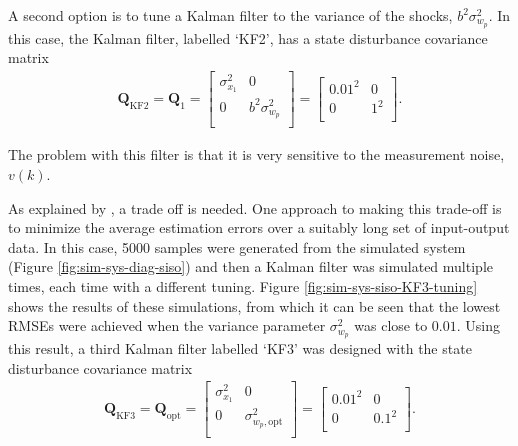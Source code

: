 A second option is to tune a Kalman filter to the variance of the shocks, $b^2\sigma_{w_p}^2$.  In this case, the Kalman filter, labelled `KF2', has a state disturbance covariance matrix
\begin{equation} \label{eq:sim-sys-siso-KF2-Q}
	\begin{aligned}
		\mathbf{Q}_{\text{KF2}}=\mathbf{Q}_1=\begin{bmatrix}
			\sigma_{x_1}^2 & 0 \\
			0 & b^2\sigma_{w_p}^2 \\
		\end{bmatrix}=\begin{bmatrix}
			0.01^2 & 0 \\
			0 & 1^2 \\
		\end{bmatrix}.
	\end{aligned}
\end{equation}

The problem with this filter is that it is very sensitive to the measurement noise, $v(k)$. 

As explained by \cite{robertson_detection_1995}, a trade off is needed. One approach to making this trade-off is to minimize the average estimation errors over a suitably long set of input-output data. In this case, 5000 samples were generated from the simulated system (Figure \ref{fig:sim-sys-diag-siso}) and then a Kalman filter was simulated multiple times, each time with a different tuning. Figure \ref{fig:sim-sys-siso-KF3-tuning} shows the results of these simulations, from which it can be seen that the lowest RMSEs were achieved when the variance parameter $\sigma_{w_p}^2$ was close to $0.01$. Using this result, a third Kalman filter labelled `KF3' was designed with the state disturbance covariance matrix 
\begin{equation} \label{eq:sim-sys-siso-KF3-Q}
	\begin{aligned}
		\mathbf{Q}_{\text{KF3}}=\mathbf{Q}_{\text{opt}}=\begin{bmatrix}
			\sigma_{x_1}^2 & 0 \\
			0 & \sigma_{w_p,\text{opt}}^2 \\
		\end{bmatrix}=\begin{bmatrix}
			0.01^2 & 0 \\
			0 & 0.1^2 \\
		\end{bmatrix}.
	\end{aligned}
\end{equation}

